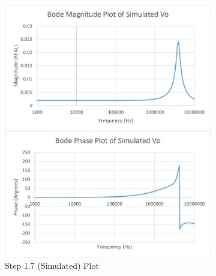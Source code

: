 \documentclass[12pt]{article}
\begin{document}
\begin{itemize}
\begin{enumerate}
\begin{figure}[!ht]
\begin{subfigure}{0.49\textwidth}
                \includegraphics[width=\textwidth]{Q5Sim}
                \caption{\label{fig:Q5Sim}Step 1.7 (Simulated) Plot}
            \end{subfigure}
            \begin{subfigure}{0.49\textwidth}
                \centering

\end{subfigure}
\end{figure}
\end{enumerate}
\end{itemize}
\end{document}
